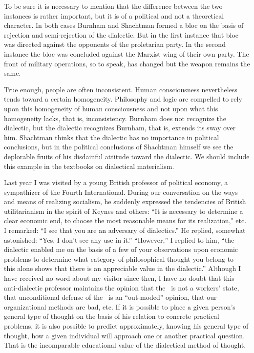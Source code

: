 To be sure it is necessary to mention that the difference between the two instances is rather important, but it is of a political and not a theoretical character. In both cases Burnham and Shachtman formed a bloc on the basis of rejection and semi-rejection of the dialectic. But in the first instance that bloc was directed against the opponents of the proletarian party. In the second instance the bloc was concluded against the Marxist wing of their own party. The front of military operations, so to speak, has changed but the weapon remains the same.

True enough, people are often inconsistent. Human consciousness nevertheless tends toward a certain homogeneity. Philosophy and logic are compelled to rely upon this homogeneity of human consciousness and not upon what this homogeneity lacks, that is, inconsistency. Burnham does not recognize the dialectic, but the dialectic recognizes Burnham, that is, extends its sway over him. Shachtman thinks that the dialectic has no importance in political conclusions, but in the political conclusions of Shachtman himself we see the deplorable fruits of his disdainful attitude toward the dialectic. We should include this example in the textbooks on dialectical materialism.

Last year I was visited by a young British professor of political economy, a sympathizer of the Fourth International. During our conversation on the ways and means of realizing socialism, he suddenly expressed the tendencies of British utilitarianism in the spirit of Keynes and others: “It is necessary to determine a clear economic end, to choose the most reasonable means for its realization," etc. I remarked: “I see that you are an adversary of dialectics.” He replied, somewhat astonished: “Yes, I don’t see any use in it.” “However,” I replied to him, “the dialectic enabled me on the basis of a few of your observations upon economic problems to determine what category of philosophical thought you belong to---this alone shows that there is an appreciable value in the dialectic.” Although I have received no word about my visitor since then, I have no doubt that this anti-dialectic professor maintains the opinion that the \USSR\ is not a workers’ state, that unconditional defense of the \USSR\ is an “out-moded” opinion, that our organizational methods are bad, etc. If it is possible to place a given person’s general type of thought on the basis of his relation to concrete practical problems, it is also possible to predict approximately, knowing his general type of thought, how a given individual will approach one or another practical question. That is the incomparable educational value of the dialectical method of thought.

